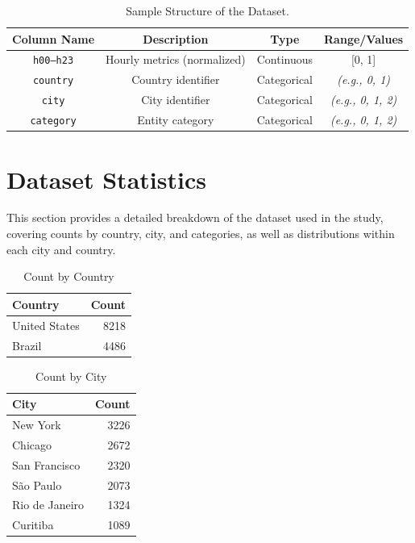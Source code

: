 \documentclass{ieeeaccess}
\begin{document}

\begin{table}[!h]
\caption{Sample Structure of the Dataset.}
\centering
\begin{tabular}{|c|c|c|c|}
\hline
\textbf{Column Name} & \textbf{Description} & \textbf{Type} & \textbf{Range/Values} \\ \hline
\texttt{h00--h23} & Hourly metrics (normalized) & Continuous & [0, 1] \\ \hline
\texttt{country} & Country identifier & Categorical & \textit{(e.g., 0, 1)} \\ \hline
\texttt{city} & City identifier & Categorical & \textit{(e.g., 0, 1, 2)} \\ \hline
\texttt{category} & Entity category & Categorical & \textit{(e.g., 0, 1, 2)} \\ \hline
\end{tabular}
\label{table:dataset_structure}
\end{table}

\section{Dataset Statistics}

This section provides a detailed breakdown of the dataset used in the study, covering counts by country, city, and categories, as well as distributions within each city and country.

\begin{table}[h!]
\centering
\caption{Count by Country}
\label{tab:count_by_country}
\begin{tabular}{|l|r|}
\hline
\textbf{Country} & \textbf{Count} \\
\hline
United States & 8218 \\
Brazil        & 4486 \\
\hline
\end{tabular}
\end{table}

\begin{table}[h!]
\centering
\caption{Count by City}
\label{tab:count_by_city}
\begin{tabular}{|l|r|}
\hline
\textbf{City}      & \textbf{Count} \\
\hline
New York & 3226 \\
Chicago & 2672 \\
San Francisco & 2320 \\
São Paulo & 2073 \\
Rio de Janeiro & 1324 \\
Curitiba & 1089 \\
\hline
\end{tabular}
\end{table}
\end{document}
